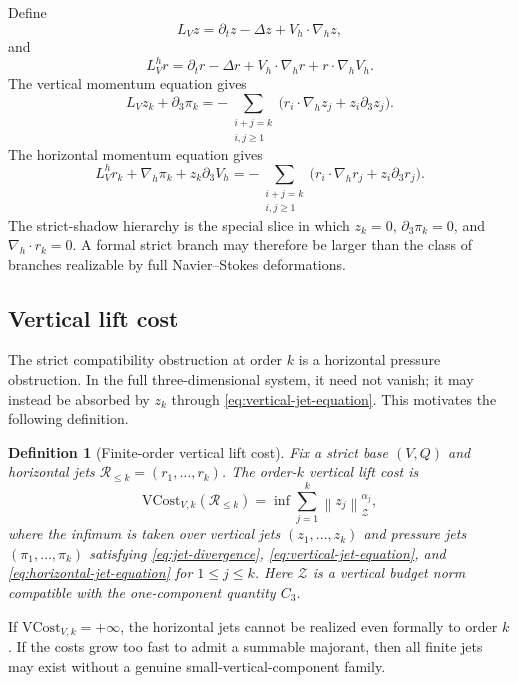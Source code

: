 \documentclass[11pt]{article}
\numberwithin{equation}{section}
\newtheorem{definition}[theorem]{Definition}
\newcommand{\nabh}{\nabla_h}
\newcommand{\divh}{\nabla_h\cdot}
\newcommand{\norm}[2]{\left\|#1\right\|_{#2}}
\newcommand{\calR}{\mathcal R}
\newcommand{\calZ}{\mathcal Z}
\begin{document}
Define
\[
L_Vz=\partial_tz-\Delta z+V_h\cdot\nabh z,
\]
and
\[
L_V^hr=\partial_tr-\Delta r+V_h\cdot\nabh r+r\cdot\nabh V_h.
\]
The vertical momentum equation gives
\begin{equation}\label{eq:vertical-jet-equation}
L_Vz_k+\partial_3\pi_k
=
-\sum_{\substack{i+j=k\\ i,j\ge1}}
\bigl(r_i\cdot\nabh z_j+z_i\partial_3z_j\bigr).
\end{equation}
The horizontal momentum equation gives
\begin{equation}\label{eq:horizontal-jet-equation}
L_V^hr_k+\nabh\pi_k+z_k\partial_3V_h
=
-\sum_{\substack{i+j=k\\ i,j\ge1}}
\bigl(r_i\cdot\nabh r_j+z_i\partial_3r_j\bigr).
\end{equation}
The strict-shadow hierarchy is the special slice in which \(z_k=0\), \(\partial_3\pi_k=0\), and \(\divh r_k=0\).  A formal strict branch may therefore be larger than the class of branches realizable by full Navier--Stokes deformations.

\subsection{Vertical lift cost}

The strict compatibility obstruction at order \(k\) is a horizontal pressure obstruction.  In the full three-dimensional system, it need not vanish; it may instead be absorbed by \(z_k\) through \eqref{eq:vertical-jet-equation}.  This motivates the following definition.

\begin{definition}[Finite-order vertical lift cost]\label{def:VCost}
Fix a strict base \((V,Q)\) and horizontal jets \(\calR_{\le k}=(r_1,\ldots,r_k)\).  The order-\(k\) vertical lift cost is
\begin{equation}\label{eq:VCost-def}
\mathrm{VCost}_{V,k}(\calR_{\le k})
=
\inf
\sum_{j=1}^k\norm{z_j}{\calZ}^{\alpha_j},
\end{equation}
where the infimum is taken over vertical jets \((z_1,\ldots,z_k)\) and pressure jets \((\pi_1,\ldots,\pi_k)\) satisfying \eqref{eq:jet-divergence}, \eqref{eq:vertical-jet-equation}, and \eqref{eq:horizontal-jet-equation} for \(1\le j\le k\).  Here \(\calZ\) is a vertical budget norm compatible with the one-component quantity \(C_3\).
\end{definition}

If \(\mathrm{VCost}_{V,k}=+\infty\), the horizontal jets cannot be realized even formally to order \(k\).  If the costs grow too fast to admit a summable majorant, then all finite jets may exist without a genuine small-vertical-component family.
\end{document}
